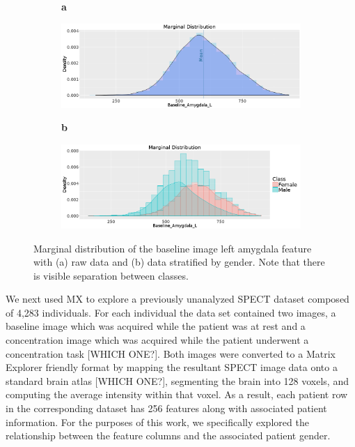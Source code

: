 \documentclass[review]{siamart0516}
\begin{document}
\begin{figure}[t]
	\centering
	\begin{subfigure}[t]{0.01\textwidth}
		\textbf{a}
	\end{subfigure}
	\begin{subfigure}[t]{0.48\textwidth}
		\includegraphics[width=\textwidth,valign=t]{Figures/Spect_Gender/NonClass_Baseline_Amygdala_L.png}
		\subcaption{}
		\label{fig:FigSpecNoClassMarginal}
	\end{subfigure}\hfill
	\begin{subfigure}[t]{0.01\textwidth}
		\textbf{b}
	\end{subfigure}
	\begin{subfigure}[t]{0.48\textwidth}
		\includegraphics[width=\textwidth,valign=t]{Figures/Spect_Gender/Baseline_Amygdala_L_Marginal.png}
		\subcaption{}
		\label{fig:FigSpecMarginal}
	\end{subfigure}
	\vspace{-1.5\baselineskip}
	\caption{Marginal distribution of the baseline image left amygdala feature with (a) raw data and (b) data stratified by gender. Note that there is visible separation between classes.}
	\label{fig:FigSpectMarginalCaption}
\end{figure}

We next used MX to explore a previously unanalyzed SPECT dataset composed of 4,283 individuals. For each individual the data set contained two images, a baseline image which was acquired while the patient was at rest and a concentration image which was acquired while the patient underwent a concentration task [WHICH ONE?]. Both images were converted to a Matrix Explorer friendly format by mapping the resultant SPECT image data onto a standard brain atlas [WHICH ONE?], segmenting the brain into 128 voxels, and computing the average intensity within that voxel. As a result, each patient row in the corresponding dataset has 256 features along with associated patient information. For the purposes of this work, we specifically explored the relationship between the feature columns and the associated patient gender. 
\end{document}
